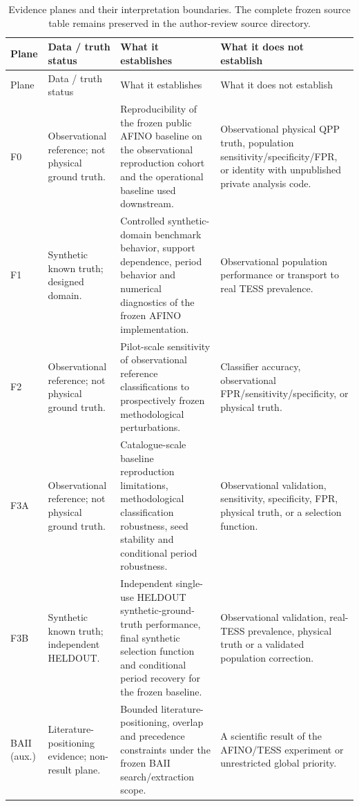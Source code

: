\begin{longtable}{@{}>{\RaggedRight\arraybackslash}p{}>{\RaggedRight\arraybackslash}p{}>{\RaggedRight\arraybackslash}p{}>{\RaggedRight\arraybackslash}p{}@{}}
\caption{Evidence planes and their interpretation boundaries. The complete frozen source table remains preserved in the author-review source directory.}\label{tab:evidence_planes}\\
\toprule
Plane & Data / truth status & What it establishes & What it does not establish \\
\midrule
\endfirsthead
\toprule
Plane & Data / truth status & What it establishes & What it does not establish \\
\midrule
\endhead
F0 & Observational reference; not physical ground truth. & Reproducibility of the frozen public AFINO baseline on the observational reproduction cohort and the operational baseline used downstream. & Observational physical QPP truth, population sensitivity/specificity/FPR, or identity with unpublished private analysis code. \\
F1 & Synthetic known truth; designed domain. & Controlled synthetic-domain benchmark behavior, support dependence, period behavior and numerical diagnostics of the frozen AFINO implementation. & Observational population performance or transport to real TESS prevalence. \\
F2 & Observational reference; not physical ground truth. & Pilot-scale sensitivity of observational reference classifications to prospectively frozen methodological perturbations. & Classifier accuracy, observational FPR/sensitivity/specificity, or physical truth. \\
F3A & Observational reference; not physical ground truth. & Catalogue-scale baseline reproduction limitations, methodological classification robustness, seed stability and conditional period robustness. & Observational validation, sensitivity, specificity, FPR, physical truth, or a selection function. \\
F3B & Synthetic known truth; independent HELDOUT. & Independent single-use HELDOUT synthetic-ground-truth performance, final synthetic selection function and conditional period recovery for the frozen baseline. & Observational validation, real-TESS prevalence, physical truth or a validated population correction. \\
BAII (aux.) & Literature-positioning evidence; non-result plane. & Bounded literature-positioning, overlap and precedence constraints under the frozen BAII search/extraction scope. & A scientific result of the AFINO/TESS experiment or unrestricted global priority. \\
\bottomrule
\end{longtable}
